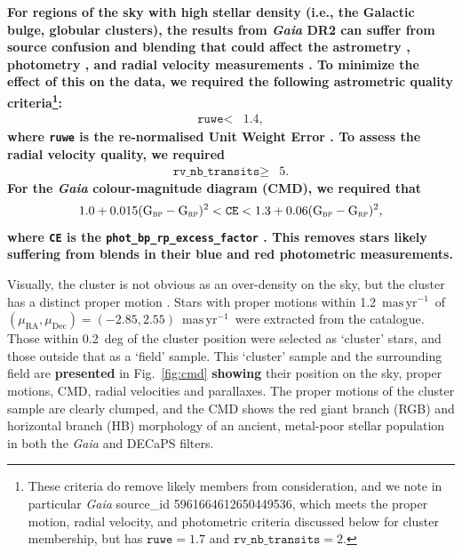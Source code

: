 \documentclass[fleqn,usenatbib]{mnras}
\newcommand{\masyr}{\ensuremath{\textrm{mas}\,\textrm{yr}^{-1}}}
\newcommand{\bprp}{\ensuremath{\textrm{G}_\textrm{\textsc{bp}}-\textrm{G}_\textrm{\textsc{rp}}}}
\begin{document}
\textbf{For regions of the sky with high stellar density (i.e., the Galactic bulge, globular clusters), the results from \textit{Gaia} DR2 can suffer from source confusion and blending that could affect the astrometry \citep[e.g.,][]{Lindegren:2018gy}, photometry \citep[e.g.,][]{Babusiaux:2018di}, and radial velocity measurements \citep[e.g.,][]{Boubert2019}. To minimize the effect of this on the data, we required the following astrometric quality criteria\footnote{These criteria do remove likely members from consideration, and we note in particular \textit{Gaia} source\_id 5961664612650449536, which meets the proper motion, radial velocity, and photometric criteria discussed below for cluster membership, but has $\texttt{ruwe}=1.7$ and $\texttt{rv\_nb\_transits}=2$.}:}
\begin{align}
	\texttt{ruwe} < & 1.4,
\end{align}
\textbf{where \texttt{ruwe} is the re-normalised Unit Weight Error \citep[defined in][]{Lindegren2018}. To assess the radial velocity quality, we required}
\begin{align}
\texttt{rv\_nb\_transits} \geq & 5.
\end{align}
\textbf{For the \textit{Gaia} colour-magnitude diagram (CMD), we required that \begin{equation}\label{eq:good_photom}
	1.0 + 0.015(\bprp)^2<\texttt{CE}<1.3 + 0.06(\bprp)^2,
\end{equation}
where \texttt{CE} is the \texttt{phot\_bp\_rp\_excess\_factor} \citep{Babusiaux:2018di}. This removes stars likely suffering from blends in their blue and red photometric measurements.}

Visually, the cluster is not obvious as an over-density on the sky, but the cluster has a distinct proper motion \citep{Cantat-Gaudin2018, Barba2018}. Stars with proper motions within 1.2~\masyr\ of $(\mu_\mathrm{RA},\mu_\mathrm{Dec})=(-2.85,2.55)$~\masyr\ were extracted from the catalogue. Those within 0.2~deg of the cluster position were selected as `cluster' stars, and those outside that as a `field' sample. This `cluster' sample and the surrounding field are \textbf{presented} in Fig.\ \ref{fig:cmd} \textbf{showing} their position on the sky, proper motions, CMD, radial velocities and parallaxes. The proper motions of the cluster sample are clearly clumped, and the CMD shows the red giant branch (RGB) and horizontal branch (HB) morphology of an ancient, metal-poor stellar population in both the \textit{Gaia} and DECaPS filters.
\end{document}
